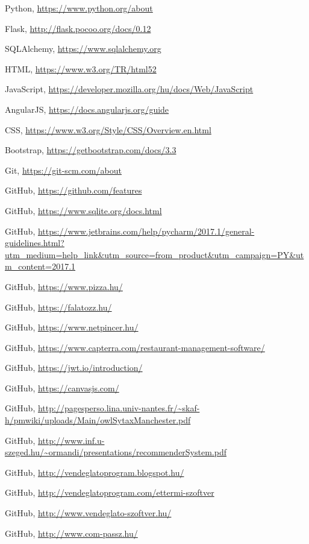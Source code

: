 \begin{thebibliography}{x}

Python, \url{https://www.python.org/about}

Flask, \url{http://flask.pocoo.org/docs/0.12}

SQLAlchemy, \url{https://www.sqlalchemy.org}

HTML, \url{https://www.w3.org/TR/html52}

JavaScript, \url{https://developer.mozilla.org/hu/docs/Web/JavaScript}

AngularJS, \url{https://docs.angularjs.org/guide}

CSS, \url{https://www.w3.org/Style/CSS/Overview.en.html}

Bootstrap, \url{https://getbootstrap.com/docs/3.3}

Git, \url{https://git-scm.com/about}

GitHub, \url{https://github.com/features}

GitHub, \url{https://www.sqlite.org/docs.html}

GitHub, \url{https://www.jetbrains.com/help/pycharm/2017.1/general-guidelines.html?utm_medium=help_link&utm_source=from_product&utm_campaign=PY&utm_content=2017.1}


GitHub, \url{https://www.pizza.hu/}

GitHub, \url{https://falatozz.hu/}

GitHub, \url{https://www.netpincer.hu/}

GitHub, \url{https://www.capterra.com/restaurant-management-software/}

GitHub, \url{https://jwt.io/introduction/}

GitHub, \url{https://canvasjs.com/}

GitHub, \url{http://pagesperso.lina.univ-nantes.fr/~skaf-h/pmwiki/uploads/Main/owlSytaxManchester.pdf}

GitHub, \url{http://www.inf.u-szeged.hu/~ormandi/presentations/recommenderSystem.pdf}

GitHub, \url{http://vendeglatoprogram.blogspot.hu/}

GitHub, \url{http://vendeglatoprogram.com/ettermi-szoftver}

GitHub, \url{http://www.vendeglato-szoftver.hu/}

GitHub, \url{http://www.com-passz.hu/}


\end{thebibliography}

